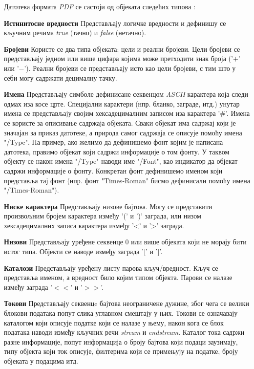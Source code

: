 \documentclass[12pt,oneside]{memoir}
\begin{document}
Датотека формата \textit{PDF} се састоји од објеката следећих типова \cite{PDFDoc, introToPdf, basicStrPdf}:
\begin{description}
\item \textbf{Истинитосне вредности} Представљају логичке вредности и дефинишу се кључним речима \textit{true} (тачно) и \textit{false} (нетачно).
\item \textbf{Бројеви} Користе се два типа објеката: цели и реални бројеви. Цели бројеви се представљају једном или више цифара којима може претходити знак броја ('$+$' или '$-$'). Реални бројеви се представљају исто као цели бројеви, с тим што у себи могу садржати децималну тачку.
\item \textbf{Имена} Представљају симболе дефинисане секвенцом \textit{ASCII} карактера која следи одмах иза косе црте. Специјални карактери (нпр. бланко, заграде, итд.) унутар имена се представљају својим хексадецималним записом иза карактера '$\#$'. Имена се користе за описивање садржаја објеката. Сваки објекат има садржај који је значајан за приказ датотеке, а природа самог садржаја се описује помоћу имена "/Type". На пример, ако желимо да дефинишемо фонт којим је написана датотека, правимо објекат који садржи информације о том фонту. У таквом објекту се након имена "/Type" наводи име "/Font", као индикатор да објекат садржи информације о фонту. Конкретан фонт дефинишемо именом који представља тај фонт (нпр. фонт "Times-Roman" бисмо дефинисали помоћу имена "/Times-Roman").
\item \textbf{Ниске карактера} Представљају низове бајтова. Могу се представити произвољним бројем карактера између '(' и ')' заграда, или низом хексадецималних записа карактера између '<' и '>' заграда.
\item \textbf{Низови} Представљају уређене секвенце 0 или више објеката који не морају бити истог типа. Објекти се наводе између заграда '[' и ']'.
\item \textbf{Каталози} Представљају уређену листу парова кључ/вредност. Кључ се представља именом, а вредност било којим типом објекта. Парови се налазе између заграда '$<<$' и '$>>$'.
\item \textbf{Токови} Представљају секвенцe бајтова неограничене дужине, због чега се велики блокови података попут слика углавном смештају у њих. Токови се означавају каталогом који описује податке који се налазе у њему, након кога се блок података наводи између кључних речи \textit{stream} и \textit{endstream}. Каталог тока садржи разне информације, попут информација о броју бајтова који подаци заузимају, типу објекта који ток описује, филтерима који се примењују на податке, броју објеката у подацима итд.

\end{description}
\end{document}
